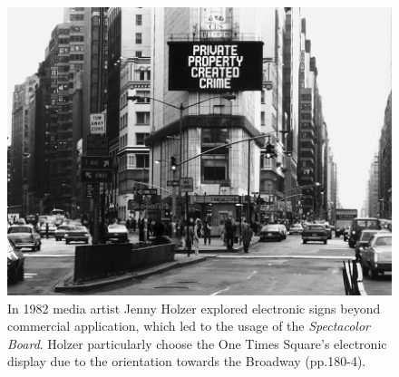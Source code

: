 \begin{figure}[!h] 
\centering
\includegraphics[width=\textwidth]{Illustrations/Spectacolor_JennyHolzer_.jpg}
\caption [\textit{Spectacolor Board} with content by Jenny Holzer, 1982] {In 1982 media artist Jenny Holzer  explored electronic signs beyond commercial application, which led to the usage of the \textit{Spectacolor Board}. Holzer particularly choose the One Times Square's electronic display due to the orientation towards the Broadway \cite{Tate_1988} (pp.180-4).}
\label{spectacolor}
\end{figure}


